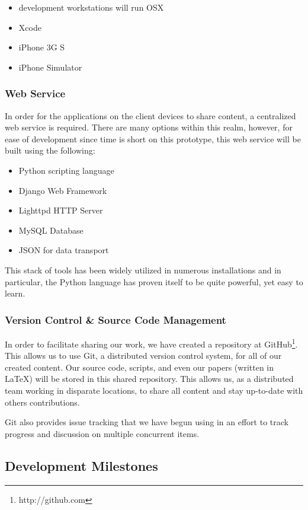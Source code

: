 \documentclass{www2010-submission}
\begin{document}
\begin{itemize}
\item development workstations will run OSX
\item Xcode
\item iPhone 3G S
\item iPhone Simulator
\end{itemize}

\subsubsection{ Web Service }

In order for the applications on the client devices to share content, a
centralized web service is required.  There are many options within this realm,
however, for ease of development since time is short on this prototype, this
web service will be built using the following:

\begin{itemize}
\item Python scripting language
\item Django Web Framework
\item Lighttpd HTTP Server
\item MySQL Database
\item JSON for data transport
\end{itemize}

This stack of tools has been widely utilized in numerous installations and in
particular, the Python language has proven itself to be quite powerful, yet
easy to learn.

\subsubsection{ Version Control \& Source Code Management }

In order to facilitate sharing our work, we have created a repository at
GitHub\footnote{http://github.com}.  This allows us to use Git, a distributed
version control system, for all of our created content.  Our source code,
scripts, and even our papers (written in \LaTeX) will be stored in this shared
repository.  This allows us, as a distributed team working in disparate
locations, to share all content and stay up-to-date with others contributions.

Git also provides issue tracking that we have begun using in an effort to track
progress and discussion on multiple concurrent items.

\subsection{ Development Milestones  }
\end{document}
